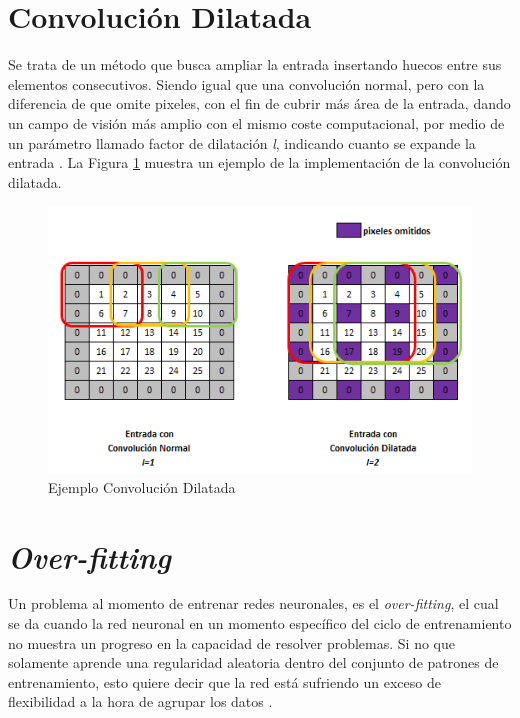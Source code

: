 \section{Convolución Dilatada}

Se trata de un método que busca ampliar la entrada insertando huecos entre sus elementos consecutivos. Siendo igual que una convolución normal, pero con la diferencia de que omite pixeles, con el fin de cubrir más área de la entrada, dando un campo de visión más amplio con el mismo coste computacional, por medio de un parámetro llamado factor de dilatación \textit{l}, indicando cuanto se expande la entrada \cite{wu2019fastfcn}. La Figura \ref{fig:cd} muestra un ejemplo de la implementación de la convolución dilatada.

\begin{figure}[ht]
	\centering
	\includegraphics[scale=0.6]{Figs/Convolucion_dilatada.png}
	\caption{Ejemplo Convolución Dilatada}
	\label{fig:cd}
\end{figure}

\section{\textit{Over-fitting}}

Un problema al momento de entrenar redes neuronales, es el \textit{over-fitting}, el cual se da cuando la red neuronal en un momento específico del ciclo de entrenamiento no muestra un progreso en la capacidad de resolver problemas. Si no que solamente aprende una regularidad aleatoria dentro del conjunto de patrones de entrenamiento, esto quiere decir que la red está sufriendo un exceso de flexibilidad a la hora de agrupar los datos \cite{jabbar2015methods}.


